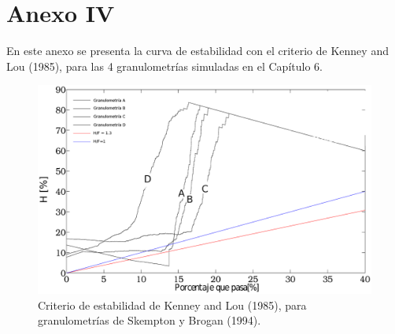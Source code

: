 \renewcommand{\appendixtocname}{Anexo IV}
\appendix
\clearpage
 \addappheadtotoc %

\chapter*{ Anexo IV} 
En este anexo se presenta la curva de estabilidad con el criterio de Kenney and Lou (1985), para las 4 granulometr\'ias simuladas en el Cap\'itulo 6.\\

\begin{figure}[htb]
\centering
\includegraphics[width=1.1\textwidth]{Anexo4/f_vs_h3}
\caption{Criterio de estabilidad de Kenney and Lou (1985), para granulometrías de Skempton y Brogan (1994).}
\label{fig:motor}
\end{figure}










